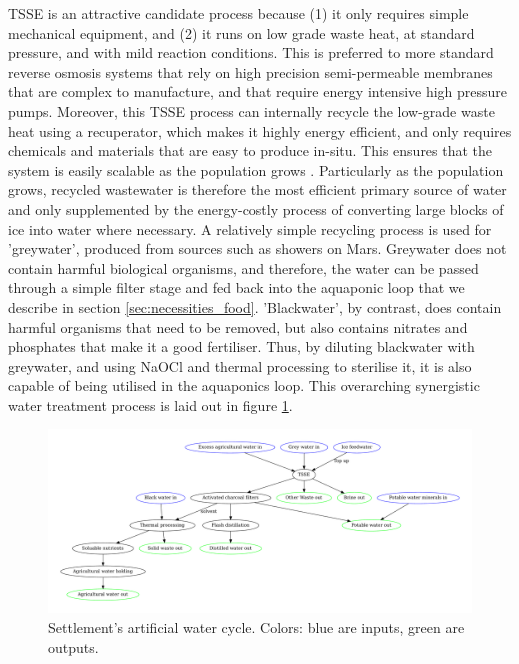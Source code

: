 \documentclass[fleqn,10pt]{Stylesheet} %
\begin{document}
TSSE is an attractive candidate process because (1) it only requires simple mechanical equipment, and (2) it runs on low grade waste heat, at standard pressure, and with mild reaction conditions. This is preferred to more standard reverse osmosis systems that rely on high precision semi-permeable membranes that are complex to manufacture, and that require energy intensive high pressure pumps. Moreover, this TSSE process can internally recycle the low-grade waste heat using a recuperator, which makes it highly energy efficient, and only requires chemicals and materials that are easy to produce in-situ. This ensures that the system is easily scalable as the population grows \cite{ChanheeBoo2019}. Particularly as the population grows, recycled wastewater is therefore the most efficient primary source of water and only supplemented by the energy-costly process of converting large blocks of ice into water where necessary. A relatively simple recycling process is used for 'greywater', produced from sources such as showers on Mars. Greywater does not contain harmful biological organisms, and therefore, the water can be passed through a simple filter stage and fed back into the aquaponic loop that we describe in section \ref{sec:necessities_food}. 'Blackwater', by contrast, does contain harmful organisms that need to be removed, but also contains nitrates and phosphates that make it a good fertiliser. Thus, by diluting blackwater with greywater, and using NaOCl and thermal processing to sterilise it, it is also capable of being utilised in the aquaponics loop. This overarching synergistic water treatment process is laid out in figure \ref{fig:water_diagram}.

\begin{figure}
    \centering
    \includegraphics[width=\linewidth]{figures/fig_water.pdf}
    \caption{Settlement's artificial water cycle. Colors: blue are inputs, green are outputs.}
    \label{fig:water_diagram}
\end{figure}
\end{document}
